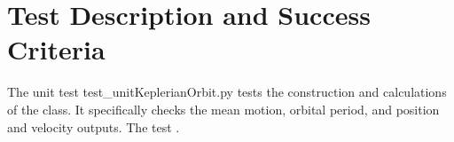 \section{Test Description and Success Criteria}
The unit test test\_unitKeplerianOrbit.py tests the construction and calculations of the class. It specifically checks the mean motion, orbital period, and position and velocity outputs. The test .